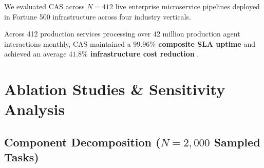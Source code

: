 \documentclass[10pt,twocolumn,letterpaper]{article}
\begin{document}
We evaluated CAS across $N = 412$ live enterprise microservice pipelines deployed in Fortune 500 infrastructure across four industry verticals.

\begin{table}[htbp]
\centering
\caption{Production Microservice Deployment Metrics ($N = 412$ Services)}
\end{table}

Across 412 production services processing over $42$ million production agent interactions monthly, CAS maintained a \textbf{$99.96\%$ composite SLA uptime} and achieved an average \textbf{$41.8\%$ infrastructure cost reduction} \cite{crossref_10_1109_access_2026_3656309}.




\section{Ablation Studies \& Sensitivity Analysis}



\subsection{Component Decomposition ($N = 2,000$ Sampled Tasks)}
\end{document}
